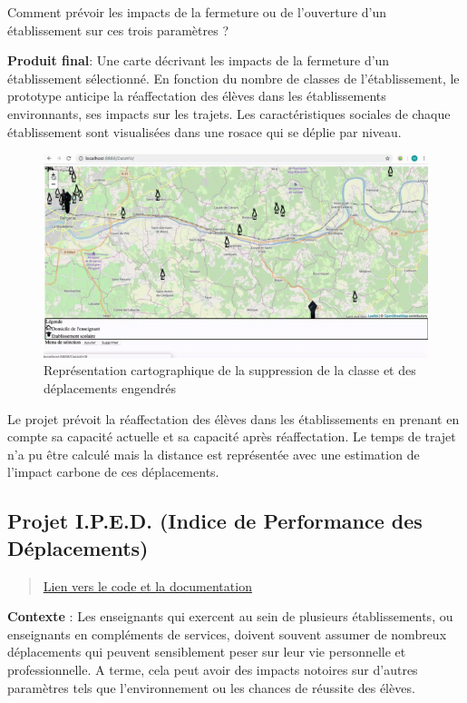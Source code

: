\documentclass[]{book}
\begin{document}
Comment prévoir les impacts de la fermeture ou de l'ouverture d'un
établissement sur ces trois paramètres ?

\textbf{Produit final}: Une carte décrivant les impacts de la fermeture
d'un établissement sélectionné. En fonction du nombre de classes de
l'établissement, le prototype anticipe la réaffectation des élèves dans
les établissements environnants, ses impacts sur les trajets. Les
caractéristiques sociales de chaque établissement sont visualisées dans
une rosace qui se déplie par niveau.

\begin{figure}

{\centering \includegraphics[width=0.6\linewidth]{./img/locaviz} 

}

\caption{Représentation cartographique de la suppression de la classe et des déplacements engendrés}\label{fig:unnamed-chunk-5}
\end{figure}

Le projet prévoit la réaffectation des élèves dans les établissements en
prenant en compte sa capacité actuelle et sa capacité après
réaffectation. Le temps de trajet n'a pu être calculé mais la distance
est représentée avec une estimation de l'impact carbone de ces
déplacements.

\subsection{Projet I.P.E.D. (Indice de Performance des
Déplacements)}\label{projet-i.p.e.d.-indice-de-performance-des-deplacements}

\begin{quote}
\href{http://datavizchallenge.fr/t/defi-numero-1-indice-annuel-d-evaluation-de-l-impact-mobilite-des-enseignants/131}{Lien
vers le code et la documentation}
\end{quote}

\textbf{Contexte} : Les enseignants qui exercent au sein de plusieurs
établissements, ou enseignants en compléments de services, doivent
souvent assumer de nombreux déplacements qui peuvent sensiblement peser
sur leur vie personnelle et professionnelle. A terme, cela peut avoir
des impacts notoires sur d'autres paramètres tels que l'environnement ou
les chances de réussite des élèves.
\end{document}
